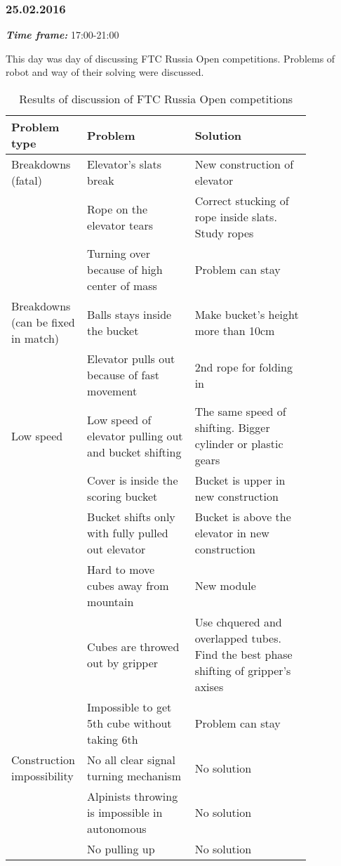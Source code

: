 \subsubsection{25.02.2016}
\textit{\textbf{Time frame:}} 17:00-21:00 

This day was day of discussing FTC Russia Open competitions. Problems of robot and way of their solving were discussed.

\begin{table}[H]
	\caption{Results of discussion of FTC Russia Open competitions}
	\label{tabular:meetingRUS28.02}
	\begin{center}
		\begin{tabular}{|p{0.12\linewidth}|p{0.35\linewidth}|p{0.38\linewidth}|}
			\hline
			Problem type & Problem & Solution \\
			\hline
			Breakdowns (fatal) & Elevator's slats break & New construction of elevator \\
			\hline
			& Rope on the elevator tears & Correct stucking of rope inside slats. Study ropes \\
			\hline
			& Turning over because of high center of mass	& Problem can stay \\
			\hline
			Breakdowns (can be fixed in match) & Balls stays inside the bucket & Make bucket's height more than 10cm \\
			\hline
			& Elevator pulls out because of fast movement	& 2nd rope for folding in \\
			\hline
			Low speed & Low speed of elevator pulling out and bucket shifting	& The same speed of shifting. Bigger cylinder or plastic gears \\
			\hline
			& Cover is inside the scoring bucket & Bucket is upper in new construction \\
			\hline
			& Bucket shifts only with fully pulled out elevator	& Bucket is above the elevator in new construction \\
			\hline
			& Hard to move cubes away from mountain & New module \\
			\hline
			& Cubes are throwed out by gripper & Use chquered and overlapped tubes. Find the best phase shifting of gripper's axises \\
			\hline
			& Impossible to get 5th cube without taking 6th & Problem can stay \\
			\hline
			Construction impossibility & No all clear signal turning mechanism & No solution\\	
			\hline
			& Alpinists throwing is impossible in autonomous & No solution \\
			\hline
			& No pulling up	& No solution\\
			\hline
		\end{tabular}
	\end{center}
\end{table}   

